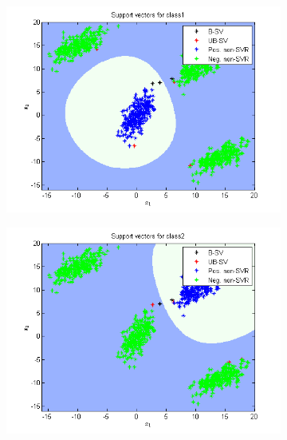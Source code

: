 \documentclass{article}
\begin{document}
\begin{figure}
\begin{subfigure}{.5\textwidth}
  \centering
  \includegraphics[width=.8\linewidth]{Classification/1a/c_g/svc1}
 
\end{subfigure}%
\begin{subfigure}{.5\textwidth}
  \centering
  \includegraphics[width=.8\linewidth]{Classification/1a/c_g/svc2}
  
\end{subfigure}
\end{figure}
\end{document}
